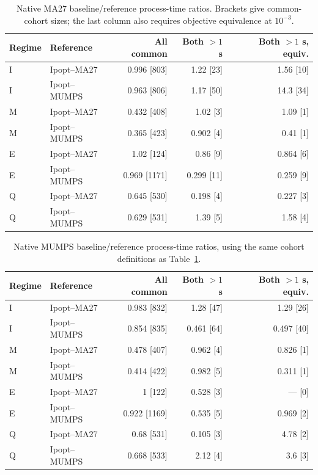 \documentclass[pdflatex,sn-mathphys-num]{sn-jnl}
\theoremstyle{thmstyleone}
\theoremstyle{thmstylethree}
\begin{document}
\begin{table}[!htbp]
\centering\small
\caption{Native MA27 baseline/reference process-time ratios. Brackets give common-cohort
sizes; the last column also requires objective equivalence at $10^{-3}$.}
\label{tab:clock-sensitivity}

\begin{tabular}{llrrr}
\toprule
Regime & Reference & All common & Both $>1$ s & Both $>1$ s, equiv. \\
\midrule
I & Ipopt--MA27 & 0.996 [803] & 1.22 [23] & 1.56 [10] \\
I & Ipopt--MUMPS & 0.963 [806] & 1.17 [50] & 14.3 [34] \\
M & Ipopt--MA27 & 0.432 [408] & 1.02 [3] & 1.09 [1] \\
M & Ipopt--MUMPS & 0.365 [423] & 0.902 [4] & 0.41 [1] \\
E & Ipopt--MA27 & 1.02 [124] & 0.86 [9] & 0.864 [6] \\
E & Ipopt--MUMPS & 0.969 [1171] & 0.299 [11] & 0.259 [9] \\
Q & Ipopt--MA27 & 0.645 [530] & 0.198 [4] & 0.227 [3] \\
Q & Ipopt--MUMPS & 0.629 [531] & 1.39 [5] & 1.58 [4] \\
\bottomrule
\end{tabular}


\end{table}



\begin{table}[!htbp]
\centering\small
\caption{Native MUMPS baseline/reference process-time ratios, using the same cohort definitions as Table~\ref{tab:clock-sensitivity}.}
\label{tab:clock-sensitivity-native-mumps}

\begin{tabular}{llrrr}
\toprule
Regime & Reference & All common & Both $>1$ s & Both $>1$ s, equiv. \\
\midrule
I & Ipopt--MA27 & 0.983 [832] & 1.28 [47] & 1.29 [26] \\
I & Ipopt--MUMPS & 0.854 [835] & 0.461 [64] & 0.497 [40] \\
M & Ipopt--MA27 & 0.478 [407] & 0.962 [4] & 0.826 [1] \\
M & Ipopt--MUMPS & 0.414 [422] & 0.982 [5] & 0.311 [1] \\
E & Ipopt--MA27 & 1 [122] & 0.528 [3] & --- [0] \\
E & Ipopt--MUMPS & 0.922 [1169] & 0.535 [5] & 0.969 [2] \\
Q & Ipopt--MA27 & 0.68 [531] & 0.105 [3] & 4.78 [2] \\
Q & Ipopt--MUMPS & 0.668 [533] & 2.12 [4] & 3.6 [3] \\
\bottomrule
\end{tabular}


\end{table}
\FloatBarrier
\end{document}
